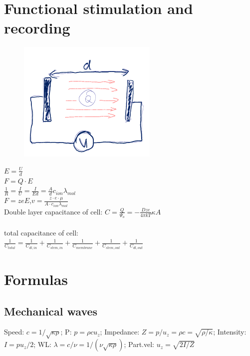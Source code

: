 \documentclass[9pt]{article}
\begin{document}
\begin{multicols}{2}
		\section{Functional stimulation and recording}
		\begin{figure}
		\includegraphics[width=0.7\linewidth]{Images/E-field.png}\\
		\end{figure}
		$E=\frac{U}{d}$\\
		$F=Q\cdot E$\\
		$\frac{1}{R}=\frac{I}{U}=\frac{I}{Ed}=\frac{A}{d}c_{ion}\lambda_{mol}$\\
		$F=zeE$,$v=\frac{z\cdot e \cdot \mu}{A\cdot c_{ion}\lambda_{mol}}$\\
		
		Double layer capacitance of cell: $C{=}\frac{Q}{\Psi_o}{=}{-}\frac{Dze}{4\pi kT}\kappa A$\\
		\\
		total capacitance of cell:\\$\frac{1}{C_{total}}=\frac{1}{C_{dl,in}}+\frac{1}{C_{stem,in}}+\frac{1}{C_{membrane}}+\frac{1}{C_{stem,out}}+\frac{1}{C_{dl,out}}$	
	
	
	
	
	
	
	
	
	\section{Formulas}                 
\subsection{Mechanical waves}
Speed: $c = 1/\sqrt{\kappa\rho}$; P: $p = \rho c u_z$;
Impedance: $Z = p/u_z = \rho c = \sqrt{\rho/\kappa}$; Intensity: $I = p u_z/2$; WL: $\lambda = {c/\nu} = {1/(\nu \sqrt{\kappa \rho})}$; Part.vel: $u_z=\sqrt{2I/Z}$


\end{multicols}
\end{document}
